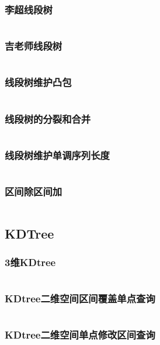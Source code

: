 \documentclass{article}
\begin{document}
\subsubsection{李超线段树}
\inputminted[breaklines]{c++}{../数据结构/李超线段树.cpp}

\subsubsection{吉老师线段树}
\inputminted[breaklines]{c++}{../数据结构/吉老师线段树.cpp}

\subsubsection{线段树维护凸包}
\inputminted[breaklines]{c++}{../数据结构/线段树维护凸包.cpp}

\subsubsection{线段树的分裂和合并}
\inputminted[breaklines]{c++}{../数据结构/线段树的分裂和合并.cpp}

\subsubsection{线段树维护单调序列长度}
\inputminted[breaklines]{c++}{../数据结构/线段树维护单调序列长度.cpp}

\subsubsection{区间除区间加}
\inputminted[breaklines]{c++}{../数据结构/区间除区间加.cpp}

\subsection{KDTree}
\subsubsection{3维KDtree}
\inputminted[breaklines]{c++}{../数据结构/3维KDtree.cpp}

\subsubsection{KDtree二维空间区间覆盖单点查询}
\inputminted[breaklines]{c++}{../数据结构/KDtree二维空间区间覆盖单点查询.cpp}

\subsubsection{KDtree二维空间单点修改区间查询}
\inputminted[breaklines]{c++}{../数据结构/KDtree二维空间单点修改区间查询.cpp}
\end{document}
